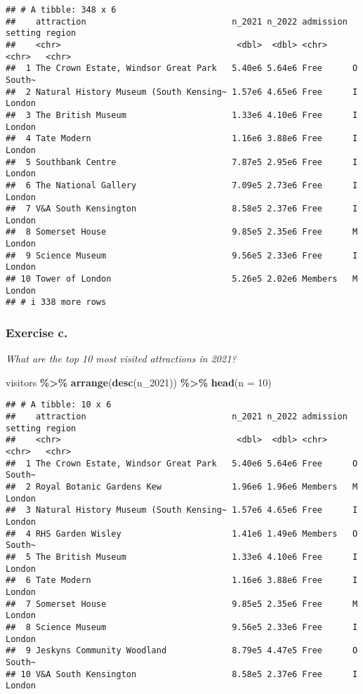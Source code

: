 \documentclass[
]{article}
\newenvironment{Shaded}{\begin{snugshade}}{\end{snugshade}}
\newcommand{\AttributeTok}[1]{\textcolor[rgb]{0.13,0.29,0.53}{#1}}
\newcommand{\DecValTok}[1]{\textcolor[rgb]{0.00,0.00,0.81}{#1}}
\newcommand{\FunctionTok}[1]{\textcolor[rgb]{0.13,0.29,0.53}{\textbf{#1}}}
\newcommand{\NormalTok}[1]{#1}
\newcommand{\SpecialCharTok}[1]{\textcolor[rgb]{0.81,0.36,0.00}{\textbf{#1}}}
\begin{document}
\begin{verbatim}
## # A tibble: 348 x 6
##    attraction                             n_2021 n_2022 admission setting region
##    <chr>                                   <dbl>  <dbl> <chr>     <chr>   <chr> 
##  1 The Crown Estate, Windsor Great Park   5.40e6 5.64e6 Free      O       South~
##  2 Natural History Museum (South Kensing~ 1.57e6 4.65e6 Free      I       London
##  3 The British Museum                     1.33e6 4.10e6 Free      I       London
##  4 Tate Modern                            1.16e6 3.88e6 Free      I       London
##  5 Southbank Centre                       7.87e5 2.95e6 Free      I       London
##  6 The National Gallery                   7.09e5 2.73e6 Free      I       London
##  7 V&A South Kensington                   8.58e5 2.37e6 Free      I       London
##  8 Somerset House                         9.85e5 2.35e6 Free      M       London
##  9 Science Museum                         9.56e5 2.33e6 Free      I       London
## 10 Tower of London                        5.26e5 2.02e6 Members   M       London
## # i 338 more rows
\end{verbatim}

\subsubsection{Exercise c.}\label{exercise-c.}

\emph{What are the top 10 most visited attractions in 2021?}

\begin{Shaded}
\begin{Highlighting}[]
\NormalTok{visitors }\SpecialCharTok{\%\textgreater{}\%} 
  \FunctionTok{arrange}\NormalTok{(}\FunctionTok{desc}\NormalTok{(n\_2021)) }\SpecialCharTok{\%\textgreater{}\%}
  \FunctionTok{head}\NormalTok{(}\AttributeTok{n =} \DecValTok{10}\NormalTok{)}
\end{Highlighting}
\end{Shaded}

\begin{verbatim}
## # A tibble: 10 x 6
##    attraction                             n_2021 n_2022 admission setting region
##    <chr>                                   <dbl>  <dbl> <chr>     <chr>   <chr> 
##  1 The Crown Estate, Windsor Great Park   5.40e6 5.64e6 Free      O       South~
##  2 Royal Botanic Gardens Kew              1.96e6 1.96e6 Members   M       London
##  3 Natural History Museum (South Kensing~ 1.57e6 4.65e6 Free      I       London
##  4 RHS Garden Wisley                      1.41e6 1.49e6 Members   O       South~
##  5 The British Museum                     1.33e6 4.10e6 Free      I       London
##  6 Tate Modern                            1.16e6 3.88e6 Free      I       London
##  7 Somerset House                         9.85e5 2.35e6 Free      M       London
##  8 Science Museum                         9.56e5 2.33e6 Free      I       London
##  9 Jeskyns Community Woodland             8.79e5 4.47e5 Free      O       South~
## 10 V&A South Kensington                   8.58e5 2.37e6 Free      I       London
\end{verbatim}
\end{document}
